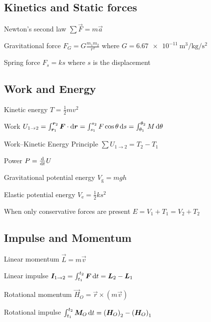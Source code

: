 \documentclass{article}
\begin{document}
\subsection{Kinetics and Static forces}
\label{sec:particle-kinetics}

\begin{description*}
\item[Newton's second law]
  \(\sum\vec{F} = m\vec{a}\)
\item[Gravitational force]
  \(F_G = G\frac{m_1m_2}{r^2}\) where
  \(G = \SI{6.67e-11}{\cubic\meter\per\kilogram\per\square\second}\)
\item[Spring force]
  \(F_s = ks\) where $s$ is the displacement
\end{description*}

\subsection{Work and Energy}
\label{sec:particle-energy}

\begin{description*}
\item[Kinetic energy]
  \(T = \frac12mv^2\)
\item[Work]
  \(U_{1\rightarrow2} = \int_{\vec{r}_1}^{\vec{r}_2}\vec{F}\cdot\dif\vec{r}
  = \int_{s_1}^{s_2}F\cos\theta\dif{s} = \int_{\theta_1}^{\theta_2}M\dif{\theta}\)
\item[Work--Kinetic Energy Principle]
  \(\sum U_{1\rightarrow2} = T_2 - T_1\)
\item[Power]
  \(P = \od{}{t}U\)
\item[Gravitational potential energy]
  \(V_\mathrm{g} = mgh\)
\item[Elastic potential energy]
  \(V_\mathrm{e} = \frac12ks^2\)
\item[When only conservative forces are present]
  \(E = V_1 + T_1 = V_2 + T_2\)

\end{description*}

\subsection{Impulse and Momentum}
\label{sec:particle-momentum}

\begin{description*}
\item[Linear momentum]
  \(\vec{L} = m\vec{v}\)
\item[Linear impulse]
  \(\vec{I}_{1\rightarrow2} = \int_{t_1}^{t_2}\vec{F}\dif{t} = \vec{L}_2 - \vec{L}_1\)
\item[Rotational momentum]
  \(\vec{H}_O = \vec{r} \times (m\vec{v})\)
\item[Rotational impulse]
  \(\int_{t_1}^{t_2}\vec{M}_O\dif{t} = {(\vec{H}_O)}_2 - {(\vec{H}_O)}_1\)
\end{description*}
\end{document}
